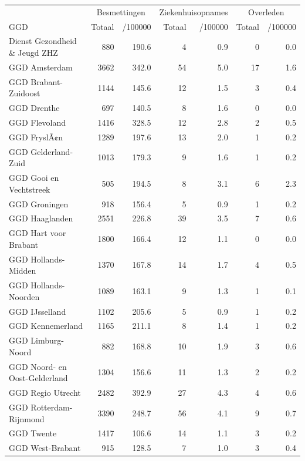 \documentclass[
  english,
  man,floatsintext]{apa6}
\begin{document}
\begin{table}
\centering\begingroup\fontsize{10}{12}\selectfont

\begin{threeparttable}
\begin{tabular}{lrrrrrr}
\toprule
\multicolumn{1}{c}{ } & \multicolumn{2}{c}{Besmettingen} & \multicolumn{2}{c}{Ziekenhuisopnames} & \multicolumn{2}{c}{Overleden} \\
\cmidrule(l{3pt}r{3pt}){2-3} \cmidrule(l{3pt}r{3pt}){4-5} \cmidrule(l{3pt}r{3pt}){6-7}
GGD & Totaal & /100000 & Totaal & /100000 & Totaal & /100000\\
\midrule
Dienst Gezondheid \& Jeugd ZHZ & 880 & 190.6 & 4 & 0.9 & 0 & 0.0\\
GGD Amsterdam & 3662 & 342.0 & 54 & 5.0 & 17 & 1.6\\
GGD Brabant-Zuidoost & 1144 & 145.6 & 12 & 1.5 & 3 & 0.4\\
GGD Drenthe & 697 & 140.5 & 8 & 1.6 & 0 & 0.0\\
GGD Flevoland & 1416 & 328.5 & 12 & 2.8 & 2 & 0.5\\
GGD FryslÃ¢n & 1289 & 197.6 & 13 & 2.0 & 1 & 0.2\\
GGD Gelderland-Zuid & 1013 & 179.3 & 9 & 1.6 & 1 & 0.2\\
GGD Gooi en Vechtstreek & 505 & 194.5 & 8 & 3.1 & 6 & 2.3\\
GGD Groningen & 918 & 156.4 & 5 & 0.9 & 1 & 0.2\\
GGD Haaglanden & 2551 & 226.8 & 39 & 3.5 & 7 & 0.6\\
GGD Hart voor Brabant & 1800 & 166.4 & 12 & 1.1 & 0 & 0.0\\
GGD Hollands-Midden & 1370 & 167.8 & 14 & 1.7 & 4 & 0.5\\
GGD Hollands-Noorden & 1089 & 163.1 & 9 & 1.3 & 1 & 0.1\\
GGD IJsselland & 1102 & 205.6 & 5 & 0.9 & 1 & 0.2\\
GGD Kennemerland & 1165 & 211.1 & 8 & 1.4 & 1 & 0.2\\
GGD Limburg-Noord & 882 & 168.8 & 10 & 1.9 & 3 & 0.6\\
GGD Noord- en Oost-Gelderland & 1304 & 156.6 & 11 & 1.3 & 2 & 0.2\\
GGD Regio Utrecht & 2482 & 392.9 & 27 & 4.3 & 4 & 0.6\\
GGD Rotterdam-Rijnmond & 3390 & 248.7 & 56 & 4.1 & 9 & 0.7\\
GGD Twente & 1417 & 106.6 & 14 & 1.1 & 3 & 0.2\\
GGD West-Brabant & 915 & 128.5 & 7 & 1.0 & 3 & 0.4\\

\end{tabular}
\end{threeparttable}
\end{table}
\end{document}
